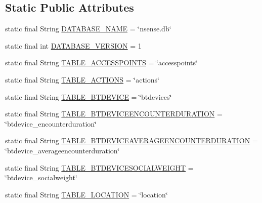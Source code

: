 \subsection*{Static Public Attributes}
\begin{DoxyCompactItemize}
\item 
static final String \hyperlink{classcs_1_1nsense_1_1db_1_1_n_sense_s_q_lite_helper_a61d49e2878d4168d774f0d55d7bb88b4}{D\-A\-T\-A\-B\-A\-S\-E\-\_\-\-N\-A\-M\-E} = \char`\"{}nsense.\-db\char`\"{}
\item 
static final int \hyperlink{classcs_1_1nsense_1_1db_1_1_n_sense_s_q_lite_helper_a1109e58faee78612b28a39872080178a}{D\-A\-T\-A\-B\-A\-S\-E\-\_\-\-V\-E\-R\-S\-I\-O\-N} = 1
\item 
static final String \hyperlink{classcs_1_1nsense_1_1db_1_1_n_sense_s_q_lite_helper_a9a6331652376a999a67cdecf516d2fb4}{T\-A\-B\-L\-E\-\_\-\-A\-C\-C\-E\-S\-S\-P\-O\-I\-N\-T\-S} = \char`\"{}accesspoints\char`\"{}
\item 
static final String \hyperlink{classcs_1_1nsense_1_1db_1_1_n_sense_s_q_lite_helper_a5f659e28731b09d4ca291943321aa63d}{T\-A\-B\-L\-E\-\_\-\-A\-C\-T\-I\-O\-N\-S} = \char`\"{}actions\char`\"{}
\item 
static final String \hyperlink{classcs_1_1nsense_1_1db_1_1_n_sense_s_q_lite_helper_a6962c6911182283046c7abc906fbb2ab}{T\-A\-B\-L\-E\-\_\-\-B\-T\-D\-E\-V\-I\-C\-E} = \char`\"{}btdevices\char`\"{}
\item 
static final String \hyperlink{classcs_1_1nsense_1_1db_1_1_n_sense_s_q_lite_helper_ab6eb6aa729d331481384549e53844fac}{T\-A\-B\-L\-E\-\_\-\-B\-T\-D\-E\-V\-I\-C\-E\-E\-N\-C\-O\-U\-N\-T\-E\-R\-D\-U\-R\-A\-T\-I\-O\-N} = \char`\"{}btdevice\-\_\-encounterduration\char`\"{}
\item 
static final String \hyperlink{classcs_1_1nsense_1_1db_1_1_n_sense_s_q_lite_helper_a9058c3ab1e8af8ebb117a913e32a5a07}{T\-A\-B\-L\-E\-\_\-\-B\-T\-D\-E\-V\-I\-C\-E\-A\-V\-E\-R\-A\-G\-E\-E\-N\-C\-O\-U\-N\-T\-E\-R\-D\-U\-R\-A\-T\-I\-O\-N} = \char`\"{}btdevice\-\_\-averageencounterduration\char`\"{}
\item 
static final String \hyperlink{classcs_1_1nsense_1_1db_1_1_n_sense_s_q_lite_helper_aaa63b469d09dc48a11899ed1798a3f67}{T\-A\-B\-L\-E\-\_\-\-B\-T\-D\-E\-V\-I\-C\-E\-S\-O\-C\-I\-A\-L\-W\-E\-I\-G\-H\-T} = \char`\"{}btdevice\-\_\-socialweight\char`\"{}
\item 
static final String \hyperlink{classcs_1_1nsense_1_1db_1_1_n_sense_s_q_lite_helper_aa965679492becc56e3848f41083401f5}{T\-A\-B\-L\-E\-\_\-\-L\-O\-C\-A\-T\-I\-O\-N} = \char`\"{}location\char`\"{}

\end{DoxyCompactItemize}
